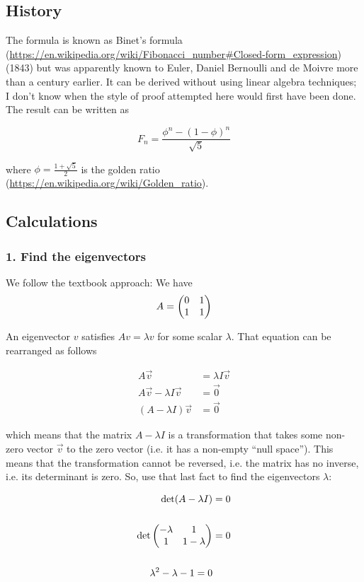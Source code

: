 \subsection*{History}

The formula is known as
Binet's formula (\url{https://en.wikipedia.org/wiki/Fibonacci_number#Closed-form_expression})
(1843) but was apparently known to Euler, Daniel Bernoulli and de Moivre more
than a century earlier. It can be derived without using linear algebra
techniques; I don't know when the style of proof attempted here would first
have been done. The result can be written as

$$
F_n = \frac{\phi^n - (1-\phi)^n}{\sqrt{5}}
$$

where $\phi = \frac{1+\sqrt{5}}{2}$ is the
golden ratio (\url{https://en.wikipedia.org/wiki/Golden_ratio}).


\subsection*{Calculations}

\subsubsection{1. Find the eigenvectors}
We follow the textbook approach: We have
$$
A = \begin{pmatrix}0 & 1\\1 & 1\\ \end{pmatrix}
$$

An eigenvector $v$ satisfies $Av = \lambda v$ for some scalar $\lambda$. That
equation can be rearranged as follows

\begin{align*}
A\vec v &= \lambda I\vec v
\\
A\vec v - \lambda I\vec v &= \vec 0
\\
(A - \lambda I)\vec v &= \vec 0
\end{align*}

which means that the matrix $A - \lambda I$ is a transformation that takes some
non-zero vector $\vec v$ to the zero vector (i.e. it has a non-empty ``null
space''). This means that the transformation cannot be reversed, i.e. the matrix
has no inverse, i.e. its determinant is zero. So, use that last fact to find
the eigenvectors $\lambda$:

\begin{align*}
\det (A - \lambda I) &= 0
\\
\\
\det \begin{pmatrix}-\lambda & 1\\1           & 1 - \lambda\\ \end{pmatrix} &= 0
\\
\\
\lambda^2 - \lambda - 1 = 0
\end{align*}


